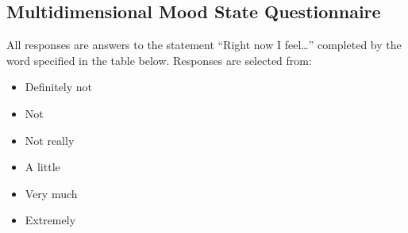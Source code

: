 \documentclass[letterpaper,10pt,english]{sphinxmanual}
\begin{document}
\subsection{Multidimensional Mood State Questionnaire}
\label{\detokenize{Data_Definations_Phase1B:multidimensional-mood-state-questionnaire}}
All responses are answers to the statement “Right now I feel…” completed
by the word specified in the table below. Responses are selected from:
\begin{itemize}
\item {} 
Definitely not

\item {} 
Not

\item {} 
Not really

\item {} 
A little

\item {} 
Very much

\item {} 
Extremely

\end{itemize}
\end{document}
